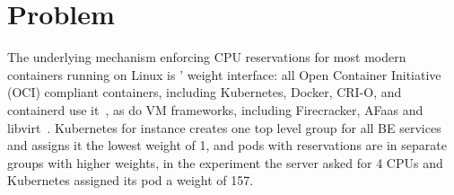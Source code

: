 
\section{Problem}

The underlying mechanism enforcing CPU reservations for most modern containers
running on Linux is \cgroups{}' weight interface: all Open Container Initiative
(OCI) compliant containers, including Kubernetes, Docker, CRI-O, and containerd
use it~\cite{oci-cgroups, docker-docs-cgroups, container-isolation-article}, as
do VM frameworks, including Firecracker, AFaas and
libvirt~\cite{firecracker-cgroups,afaas,libvirt-cgroups}. Kubernetes for
instance creates one top level group for all BE services and assigns it the
lowest weight of 1, and pods with reservations are in separate groups with
higher weights, \eg{} in the experiment the server asked for 4 CPUs and
Kubernetes assigned its pod a weight of 157.

